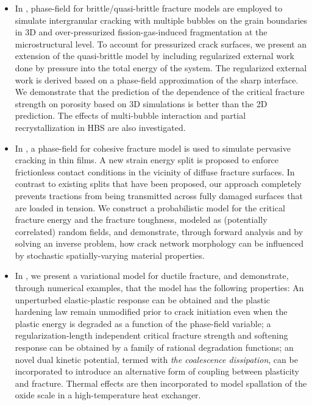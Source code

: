 \begin{itemize}
  \item %
        In , phase-field for brittle/quasi-brittle fracture models are employed to simulate intergranular cracking with multiple bubbles on the grain boundaries in 3D and over-pressurized fission-gas-induced fragmentation at the microstructural level. To account for pressurized crack surfaces, we present an extension of the quasi-brittle model by including regularized external work done by pressure into the total energy of the system. The regularized external work is derived based on a phase-field approximation of the sharp interface. We demonstrate that the prediction of the dependence of the critical fracture strength on porosity based on 3D simulations is better than the 2D prediction. The effects of multi-bubble interaction and partial recrystallization in HBS are also investigated.
  \item %
        In , a phase-field for cohesive fracture model is used to simulate pervasive cracking in thin films. A new strain energy split is proposed to enforce frictionless contact conditions in the vicinity of diffuse fracture surfaces. In contrast to existing splits that have been proposed, our approach completely prevents tractions from being transmitted across fully damaged surfaces that are loaded in tension. We construct a probabilistic model for the critical fracture energy and the fracture toughness, modeled as (potentially correlated) random fields, and demonstrate, through forward analysis and by solving an inverse problem, how crack network morphology can be influenced by stochastic spatially-varying material properties.
  \item %
        In , we present a variational model for ductile fracture, and demonstrate, through numerical examples, that the model has the following properties: An unperturbed elastic-plastic response can be obtained and the plastic hardening law remain unmodified prior to crack initiation even when the plastic energy is degraded as a function of the phase-field variable; a regularization-length independent critical fracture strength and softening response can be obtained by a family of rational degradation functions; an novel dual kinetic potential, termed with \emph{the coalescence dissipation}, can be incorporated to introduce an alternative form of coupling between plasticity and fracture. Thermal effects are then incorporated to model spallation of the oxide scale in a high-temperature heat exchanger.
\end{itemize}
